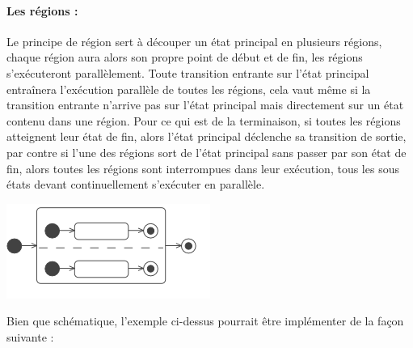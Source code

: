 \documentclass[french, 12pt, a4paper]{article}
\begin{document}
        
        \paragraph{Les régions : }
        Le principe de région sert à découper un état principal en plusieurs régions, chaque région aura alors son propre point de début et de fin, les régions s'exécuteront parallèlement. Toute transition entrante sur l'état principal entraînera l'exécution parallèle de toutes les régions, cela vaut même si la transition entrante n'arrive pas sur l'état principal mais directement sur un état contenu dans une région. Pour ce qui est de la terminaison, si toutes les régions atteignent leur état de fin, alors l'état principal déclenche sa transition de sortie, par contre si l'une des régions sort de l'état principal sans passer par son état de fin, alors toutes les régions sont interrompues dans leur exécution, tous les sous états devant continuellement s'exécuter en parallèle.
        
         \begin{center}
			\captionsetup{type=figure}
			\includegraphics[scale=1]{Images/region_state.png}
	    \end{center}
	    
	    Bien que schématique, l'exemple ci-dessus pourrait être implémenter de la façon suivante :
	    
\end{document}
